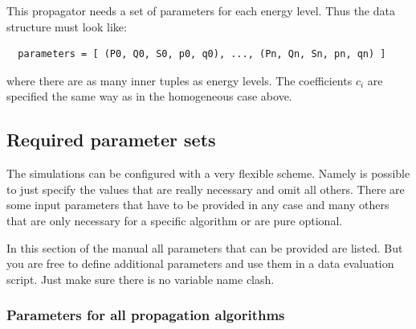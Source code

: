 \documentclass[a4paper,10pt]{report}
\begin{document}
This propagator needs a set of parameters for each energy level. Thus
the data structure must look like:

\begin{verbatim}
  parameters = [ (P0, Q0, S0, p0, q0), ..., (Pn, Qn, Sn, pn, qn) ]
\end{verbatim}

where there are as many inner tuples as energy levels. The coefficients $c_i$
are specified the same way as in the homogeneous case above.


\subsection{Required parameter sets}

The simulations can be configured with a very flexible scheme. Namely is possible
to just specify the values that are really necessary and omit all others. There
are some input parameters that have to be provided in any case and many others that
are only necessary for a specific algorithm or are pure optional.

In this section of the manual all parameters that can be provided are listed.
But you are free to define additional parameters and use them in a data evaluation
script. Just make sure there is no variable name clash.


\subsubsection{Parameters for all propagation algorithms}
\end{document}
